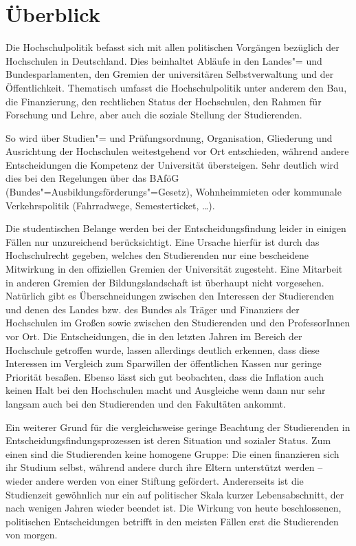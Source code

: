 \section{Überblick}
\label{hopo}

Die Hochschulpolitik befasst sich mit allen politischen Vorgängen bezüglich der
Hochschulen in Deutschland. Dies beinhaltet Abläufe in den Landes"= und
Bundesparlamenten, den Gremien der universitären Selbstverwaltung und der
Öffentlichkeit. Thematisch umfasst die Hochschulpolitik unter anderem den Bau,
die Finanzierung, den rechtlichen Status der Hochschulen, den Rahmen für
Forschung und Lehre, aber auch die soziale Stellung der Studierenden.

So wird über Studien"= und Prüfungsordnung, Organisation, Gliederung und
Ausrichtung der Hochschulen weitestgehend vor Ort entschieden, während andere
Entscheidungen die Kompetenz der Universität übersteigen. Sehr deutlich wird
dies bei den Regelungen über das BAföG (Bundes"=Ausbildungsförderungs"=Gesetz),
Wohnheimmieten oder kommunale Verkehrspolitik (Fahrradwege, Semesterticket,
\dots).

Die studentischen Belange werden bei der Entscheidungsfindung leider in einigen
Fällen nur unzureichend berücksichtigt. Eine Ursache hierfür ist durch das
Hochschulrecht gegeben, welches den Studierenden nur eine bescheidene
Mitwirkung in den offiziellen Gremien der Universität zugesteht. Eine Mitarbeit
in anderen Gremien der Bildungslandschaft ist überhaupt nicht vorgesehen.
Natürlich gibt es Überschneidungen zwischen den Interessen der Studierenden und
denen des Landes bzw. des Bundes als Träger und Finanziers der Hochschulen im
Großen sowie zwischen den Studierenden und den ProfessorInnen vor Ort. Die
Entscheidungen, die in den letzten Jahren im Bereich der Hochschule getroffen
wurde, lassen allerdings deutlich erkennen, dass diese Interessen im Vergleich
zum Sparwillen der öffentlichen Kassen nur geringe Priorität besaßen. Ebenso
lässt sich gut beobachten, dass die Inflation auch keinen Halt bei den
Hochschulen macht und Ausgleiche wenn dann nur sehr langsam auch bei den
Studierenden und den Fakultäten ankommt.

Ein weiterer Grund für die vergleichsweise geringe Beachtung der Studierenden
in Entscheidungsfindungsprozessen ist deren Situation und sozialer Status. Zum
einen sind die Studierenden keine homogene Gruppe: Die einen finanzieren sich
ihr Studium selbst, während andere durch ihre Eltern unterstützt werden --
wieder andere werden von einer Stiftung gefördert. Andererseits ist die
Studienzeit gewöhnlich nur ein auf politischer Skala kurzer Lebensabschnitt,
der nach wenigen Jahren wieder beendet ist. Die Wirkung von heute
beschlossenen, politischen Entscheidungen betrifft in den meisten Fällen erst
die Studierenden von morgen.

